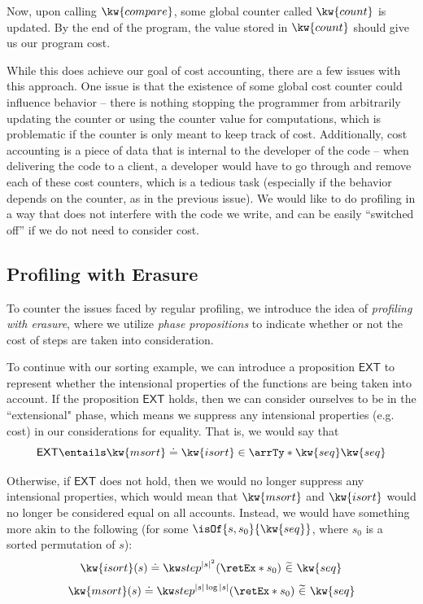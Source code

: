 \documentclass[letterpaper]{article}
\newcommand{\EXT}{\textsf{EXT}}
\begin{document}
Now, upon calling $\kw{compare}$, some global counter called $\kw{count}$ is updated. By the end of the program, the value stored in $\kw{count}$ should give us our program cost.

While this does achieve our goal of cost accounting, there are a few issues with this approach. One issue is that the existence of some global cost counter could influence behavior -- there is nothing stopping the programmer
from arbitrarily updating the counter or using the counter value for computations, which is problematic if the counter is only meant to keep track of cost.
Additionally, cost accounting is a piece of data that is internal to the developer of the code -- when delivering the code to a client, a developer would have to go through and remove each of these cost counters, which is a tedious task (especially if the behavior depends on the counter, as in the previous issue).
We would like to do profiling in a way that does not interfere with the code we write, and can be easily ``switched off'' if we do not need to consider cost.

\subsection{Profiling with Erasure}

To counter the issues faced by regular profiling, we introduce the idea of \textit{profiling with erasure}, where we utilize
\textit{phase propositions} to indicate whether or not the cost of steps are taken into consideration.

To continue with our sorting example, we can introduce a proposition $\EXT$ to represent whether the intensional properties of the functions are being taken into account.
If the proposition $\EXT$ holds, then we can consider ourselves to be in the ``extensional" phase, which means we suppress any intensional properties (e.g. cost) in our considerations for equality. That is,
we would say that \[\EXT \entails \exEqOf{\kw{msort}}{\kw{isort}}{\arrTy*{\kw{seq}}{\kw{seq}}}\]

Otherwise, if $\EXT$ does not hold, then we would no longer suppress any intensional properties, which would mean that $\kw{msort}$ and $\kw{isort}$ would no longer be considered equal on all accounts.
Instead, we would have something more akin to the following (for some $\isOf{s, s_0}{\kw{seq}}$, where $s_0$ is a sorted permutation of $s$):
\[\compEqOf{\kw{isort}(s)}{\stepEx{|s|^2}{\retEx*{s_0}}}{\kw{seq}}\]
\[\compEqOf{\kw{msort}(s)}{\stepEx{|s|\log |s|}{\retEx*{s_0}}}{\kw{seq}}\]
\end{document}
